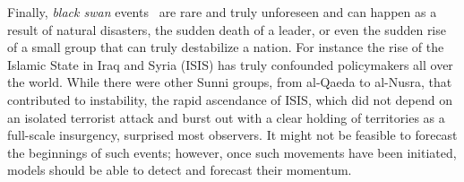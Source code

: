 Finally, {\it black swan} events~\cite{taleb-book} are rare and truly unforeseen and can happen as a
result of natural disasters, the sudden death of a leader, or even the sudden rise of a
small group that can truly destabilize a nation.  For instance the rise of the
Islamic State in Iraq and Syria (ISIS) has truly confounded policymakers all over the world.
While there were other Sunni groups, from al-Qaeda to al-Nusra, that contributed to
instability, the rapid ascendance of ISIS, which did not depend on an isolated terrorist attack and
burst out with a clear holding of territories as a full-scale insurgency, surprised most observers.
It might not be feasible to forecast the beginnings of such events; however, once such movements
have been initiated, models should be able to detect and forecast their momentum.
